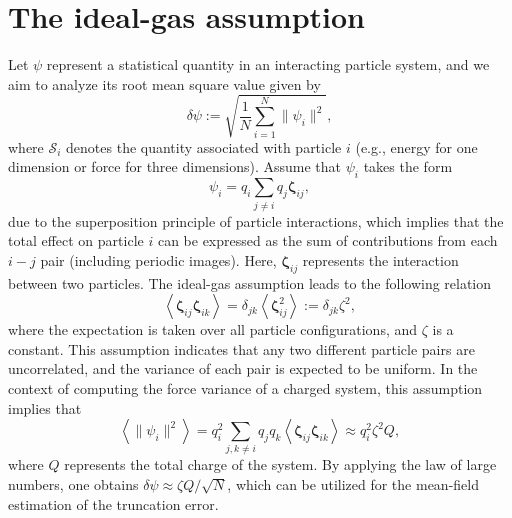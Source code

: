 \section{The ideal-gas assumption}\label{app::ideal-gas}
Let $\bm{\mathcal{\psi}}$ represent a statistical quantity in an interacting particle system, and we aim to analyze its root mean square value given by
\begin{equation}\label{eq::deltaS}
    \delta \bm{\mathcal{\psi}}:=\sqrt{\frac{1}{N}\sum_{i=1}^{N}\|\bm{\mathcal{\psi}}_{i}\|^2},
\end{equation}
where $\bm{\mathcal{S}}_{i}$ denotes the quantity associated with particle $i$ (e.g., energy for one dimension or force for three dimensions). Assume that $\bm{\mathcal{\psi}}_{i}$ takes the form
\begin{equation}
	\bm{\mathcal{\psi}}_{i}=q_{i} \sum_{j \neq i} q_{j} \bm{\zeta}_{i j},
\end{equation}
due to the superposition principle of particle interactions, which implies that the total effect on particle $i$ can be expressed as the sum of contributions from each $i-j$ pair (including periodic images). Here, $\bm{\zeta}_{i j}$ represents the interaction between two particles. The ideal-gas assumption leads to the following relation
\begin{equation}
	\left\langle\boldsymbol{\zeta}_{i j} \boldsymbol{\zeta}_{i k}\right\rangle=\delta_{j k}\left\langle\boldsymbol{\zeta}_{i j}^2\right\rangle:=\delta_{j k} \zeta^2,
\end{equation}
where the expectation is taken over all particle configurations, and $\zeta$ is a constant. This assumption indicates that any two different particle pairs are uncorrelated, and the variance of each pair is expected to be uniform. In the context of computing the force variance of a charged system, this assumption implies that
\begin{equation}
	\left\langle\|\bm{\mathcal{\psi}}_{i}\|^2\right\rangle=q_{i}^2 \sum_{j, k \neq i} q_{j} q_k\left\langle\boldsymbol{\zeta}_{i j} \boldsymbol{\zeta}_{i k}\right\rangle \approx q_{i}^2 \zeta^2 Q,
\end{equation}
where $Q$ represents the total charge of the system. By applying the law of large numbers, one obtains $\delta\mathcal{\psi}\approx \zeta Q/\sqrt{N}$, which can be utilized for the mean-field estimation of the truncation error.

